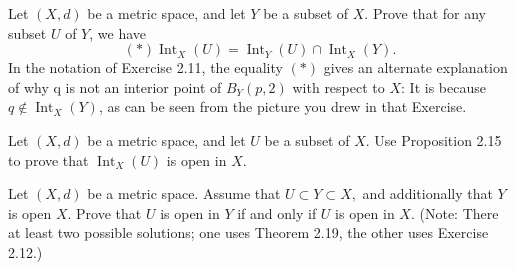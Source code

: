 \documentclass[12pt,letterpaper,boxed]{hmcpset}
\DeclareMathOperator{\Int}{Int}
\begin{document}
\begin{problem}[Exercise 2.12.]
Let $(X, d)$ be a metric space, and let $Y$ be a subset of $X$. Prove that for any subset $U$ of $Y$, we have $$(*) \Int_{X}(U) = \Int_{Y}(U)\cap\Int_{X}(Y).$$
In the notation of Exercise 2.11, the equality $(*)$ gives an alternate explanation of why q is not an interior point of $B_{Y}(p, 2)$ with respect to $X$: It is because $q \notin \Int_{X}(Y)$, as can be seen from the picture you drew in that Exercise.
\end{problem}
\begin{solution}

\end{solution}

\begin{problem}[Exercise 2.16.]
Let $(X, d)$ be a metric space, and let $U$ be a subset of $X$. Use Proposition 2.15 to prove that $\Int_{X}(U)$ is open in $X$.
\end{problem}
\begin{solution}

\end{solution}

\begin{problem}[Exercise 2.20.]
Let $(X, d)$ be a metric space. Assume that $U\subset Y\subset X,$ and additionally that $Y$ is open $X$. Prove that $U$ is open in $Y$ if and only if $U$ is open in $X$. (Note: There at least two possible solutions; one uses Theorem 2.19, the other uses Exercise 2.12.)
\end{problem}
\begin{solution}

\end{solution}
\end{document}
